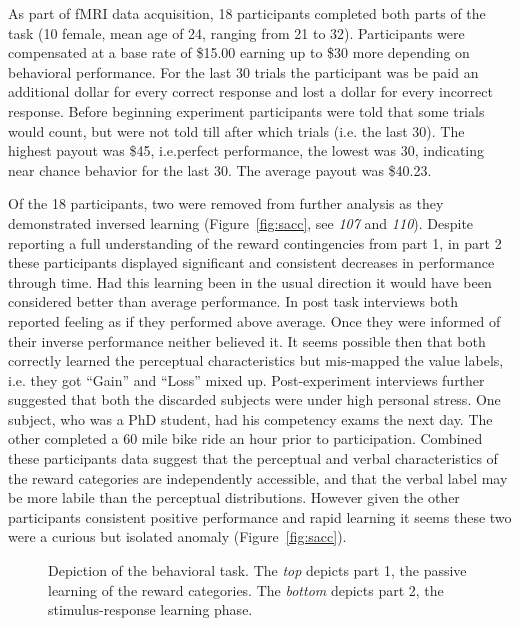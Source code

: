 \documentclass[doc,12pt]{apa}        %
\begin{document}
As part of fMRI data acquisition, 18 participants completed both parts of the task (10 female, mean age of 24, ranging from 21 to 32). Participants were compensated at a base rate of \$15.00 earning up to \$30 more depending on behavioral performance. For the last 30 trials the participant was be paid an additional dollar for every correct response and lost a dollar for every incorrect response.  Before beginning experiment participants were told that some trials would count, but were not told till after which trials (i.e. the last 30).  The highest payout was \$45, i.e.perfect performance, the lowest was 30, indicating near chance behavior for the last 30.  The average payout was \$40.23.

Of the 18 participants, two were removed from further analysis as they demonstrated inversed learning (Figure~\ref{fig:sacc}, see \emph{107} and \emph{110}).  Despite reporting a full understanding of the reward contingencies from part 1, in part 2 these participants displayed significant and consistent decreases in performance through time.  Had this learning been in the usual direction it would have been considered better than average performance.  In post task interviews both reported feeling as if they performed above average.  Once they were informed of their inverse performance neither believed it.  It seems possible then that both correctly learned the perceptual characteristics but mis-mapped the value labels, i.e. they got ``Gain'' and ``Loss''  mixed up.  Post-experiment interviews further suggested that both the discarded subjects were under high personal stress.  One subject, who was a PhD student, had his competency exams the next day.  The other completed a 60 mile bike ride an hour prior to participation.  Combined these participants data suggest that the perceptual and verbal characteristics of the reward categories are independently accessible, and that the verbal label may be more labile than the perceptual distributions.  However given the other participants consistent positive performance and rapid learning it seems these two were a curious but isolated anomaly (Figure~\ref{fig:sacc}).

\begin{figure}[tp]
    \centering
    \caption{Depiction of the behavioral task.  The \emph{top} depicts part 1, the passive learning of the reward categories.  The \emph{bottom} depicts part 2, the stimulus-response learning phase.}
	\label{fig:task}
\end{figure}
\end{document}
